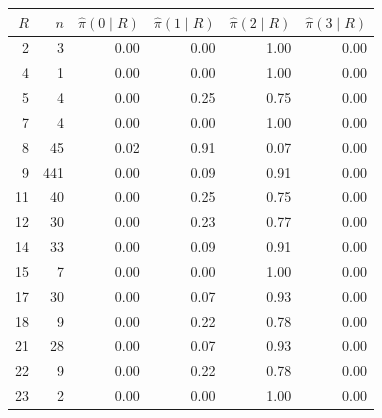 \begin{tabular}{rrrrrr}
\toprule
$R$ & $n$ & $\hat\pi(0\mid R)$ & $\hat\pi(1\mid R)$ & $\hat\pi(2\mid R)$ & $\hat\pi(3\mid R)$ \\
\midrule
2 & 3 & 0.00 & 0.00 & 1.00 & 0.00 \\
4 & 1 & 0.00 & 0.00 & 1.00 & 0.00 \\
5 & 4 & 0.00 & 0.25 & 0.75 & 0.00 \\
7 & 4 & 0.00 & 0.00 & 1.00 & 0.00 \\
8 & 45 & 0.02 & 0.91 & 0.07 & 0.00 \\
9 & 441 & 0.00 & 0.09 & 0.91 & 0.00 \\
11 & 40 & 0.00 & 0.25 & 0.75 & 0.00 \\
12 & 30 & 0.00 & 0.23 & 0.77 & 0.00 \\
14 & 33 & 0.00 & 0.09 & 0.91 & 0.00 \\
15 & 7 & 0.00 & 0.00 & 1.00 & 0.00 \\
17 & 30 & 0.00 & 0.07 & 0.93 & 0.00 \\
18 & 9 & 0.00 & 0.22 & 0.78 & 0.00 \\
21 & 28 & 0.00 & 0.07 & 0.93 & 0.00 \\
22 & 9 & 0.00 & 0.22 & 0.78 & 0.00 \\
23 & 2 & 0.00 & 0.00 & 1.00 & 0.00 \\
\bottomrule
\end{tabular}
